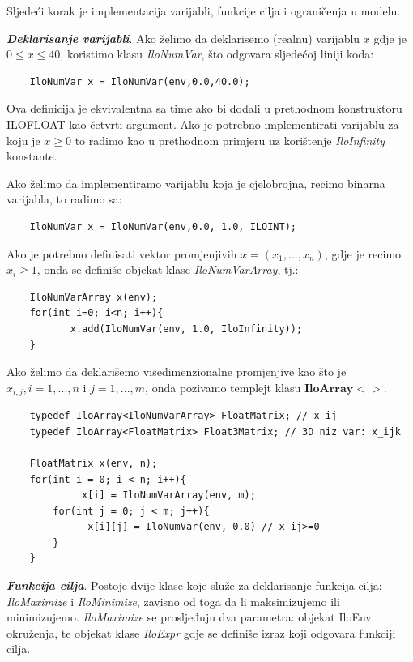 \documentclass[a4paper, utf8, 11pt, colorlinks]{book}
\begin{document}
 \noindent Sljedeći korak je implementacija varijabli, funkcije cilja i ograničenja u modelu. 
 
 \noindent \textbf{\emph{Deklarisanje varijabli}}. Ako želimo da deklarisemo (realnu) varijablu $x$ gdje je $0 \leq x \leq 40$, koristimo klasu \emph{IloNumVar}, što odgovara sljedećoj liniji koda:
 \begin{verbatim}
 	IloNumVar x = IloNumVar(env,0.0,40.0);
 \end{verbatim}
 Ova definicija je ekvivalentna sa time ako bi dodali u prethodnom konstruktoru ILOFLOAT kao četvrti argument. 
Ako je potrebno implementirati varijablu za koju je $x \geq 0$ to radimo kao u prethodnom primjeru uz korištenje  \emph{IloInfinity} konstante.
 
 Ako želimo da implementiramo varijablu koja je cjelobrojna, recimo binarna varijabla, to radimo sa:
 \begin{verbatim}
 	IloNumVar x = IloNumVar(env,0.0, 1.0, ILOINT);
 \end{verbatim}
 
 \noindent Ako je potrebno definisati vektor promjenjivih $x=(x_1,...,x_n)$, gdje je recimo $x_i \geq 1$, onda se definiše objekat klase \emph{IloNumVarArray}, tj.:
 \begin{verbatim}
 	IloNumVarArray x(env);
 	for(int i=0; i<n; i++){
 		   x.add(IloNumVar(env, 1.0, IloInfinity));
 	}
 \end{verbatim}
 
 \noindent Ako želimo da deklarišemo visedimenzionalne promjenjive kao što je $x_{i,j}, i=1,...,n$ i $j=1,...,m$, onda pozivamo templejt klasu $\textbf{IloArray}<>$.
 
 \begin{verbatim}
 	typedef IloArray<IloNumVarArray> FloatMatrix; // x_ij 
 	typedef IloArray<FloatMatrix> Float3Matrix; // 3D niz var: x_ijk
 	
 	FloatMatrix x(env, n);
 	for(int i = 0; i < n; i++){
 		     x[i] = IloNumVarArray(env, m);
 		for(int j = 0; j < m; j++){
 		  	  x[i][j] = IloNumVar(env, 0.0) // x_ij>=0
 		}
 	}
 \end{verbatim}
 
 \noindent \textbf{\emph{Funkcija cilja}}. 
 Postoje dvije klase koje služe za deklarisanje funkcija cilja: \emph{IloMaximize} i \emph{IloMinimize}, zavisno od toga da li maksimizujemo ili minimizujemo. \emph{IloMaximize} se prosljeđuju dva parametra: objekat IloEnv okruženja, te objekat klase \emph{IloExpr} gdje se definiše  izraz koji odgovara funkciji cilja. 
 
\end{document}
